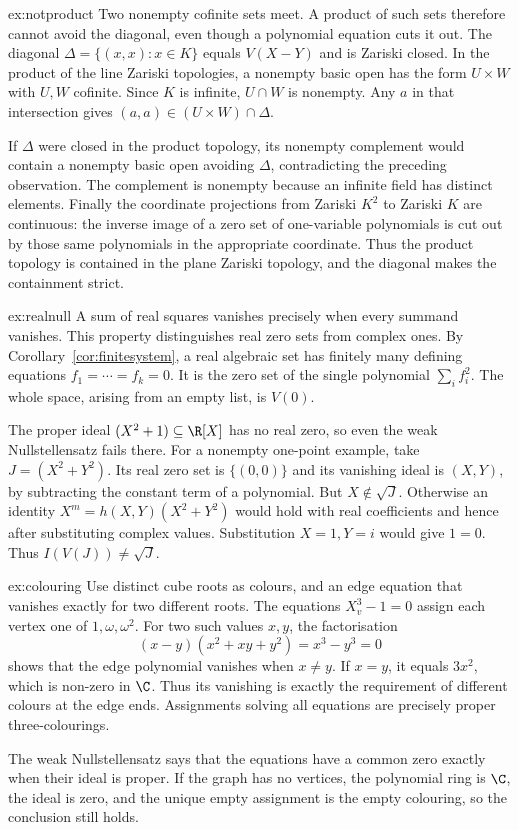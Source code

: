 \begin{solution}{ex:notproduct}
\idea Two nonempty cofinite sets meet. A product of such sets therefore cannot avoid the diagonal, even though a polynomial equation cuts it out.
\writeup The diagonal $\Delta=\{(x,x):x\in K\}$ equals $V(X-Y)$ and is Zariski closed. In the product of the line Zariski topologies, a nonempty basic open has the form $U\times W$ with $U,W$ cofinite. Since $K$ is infinite, $U\cap W$ is nonempty. Any $a$ in that intersection gives $(a,a)\in(U\times W)\cap\Delta$.

If $\Delta$ were closed in the product topology, its nonempty complement would contain a nonempty basic open avoiding $\Delta$, contradicting the preceding observation. The complement is nonempty because an infinite field has distinct elements. Finally the coordinate projections from Zariski $K^2$ to Zariski $K$ are continuous: the inverse image of a zero set of one-variable polynomials is cut out by those same polynomials in the appropriate coordinate. Thus the product topology is contained in the plane Zariski topology, and the diagonal makes the containment strict.
\end{solution}

\begin{solution}{ex:realnull}
\idea A sum of real squares vanishes precisely when every summand vanishes. This property distinguishes real zero sets from complex ones.
\writeup By Corollary~\ref{cor:finitesystem}, a real algebraic set has finitely many defining equations $f_1=\cdots=f_k=0$. It is the zero set of the single polynomial $\sum_i f_i^2$. The whole space, arising from an empty list, is $V(0)$.

The proper ideal $(X^2+1)\subseteq\R[X]$ has no real zero, so even the weak Nullstellensatz fails there. For a nonempty one-point example, take $J=(X^2+Y^2)$. Its real zero set is $\{(0,0)\}$ and its vanishing ideal is $(X,Y)$, by subtracting the constant term of a polynomial. But $X\notin\sqrt J$. Otherwise an identity $X^m=h(X,Y)(X^2+Y^2)$ would hold with real coefficients and hence after substituting complex values. Substitution $X=1,Y=i$ would give $1=0$. Thus $I(V(J))\ne\sqrt J$.
\end{solution}

\begin{solution}{ex:colouring}
\idea Use distinct cube roots as colours, and an edge equation that vanishes exactly for two different roots.
\writeup The equations $X_v^3-1=0$ assign each vertex one of $1,\omega,\omega^2$. For two such values $x,y$, the factorisation
\[
(x-y)(x^2+xy+y^2)=x^3-y^3=0
\]
shows that the edge polynomial vanishes when $x\ne y$. If $x=y$, it equals $3x^2$, which is non-zero in $\C$. Thus its vanishing is exactly the requirement of different colours at the edge ends. Assignments solving all equations are precisely proper three-colourings.

The weak Nullstellensatz says that the equations have a common zero exactly when their ideal is proper. If the graph has no vertices, the polynomial ring is $\C$, the ideal is zero, and the unique empty assignment is the empty colouring, so the conclusion still holds.
\end{solution}

